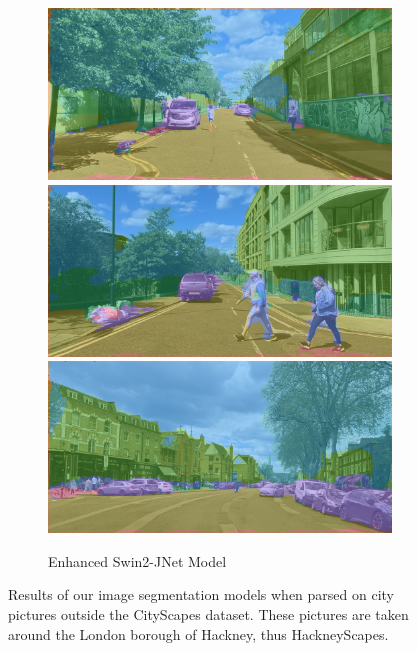 \begin{figure}[H]
\begin{subfigure}[t]{.32\textwidth}
		\includegraphics[width=\textwidth]{city_images/HackneyScapes/Hackney3164_swin2_no_background.png} \\[5pt]
		\includegraphics[width=\textwidth]{city_images/HackneyScapes/Hackney3173_swin2_no_background.png} \\[5pt]
		\includegraphics[width=\textwidth]{city_images/HackneyScapes/Hackney3204_swin2_no_background.png}
		\caption{Enhanced Swin2-JNet Model}
	\end{subfigure}
	\caption{Results of our image segmentation models when parsed on city pictures outside the CityScapes dataset. These pictures are taken around the London borough of Hackney, thus HackneyScapes.}
\end{figure}

